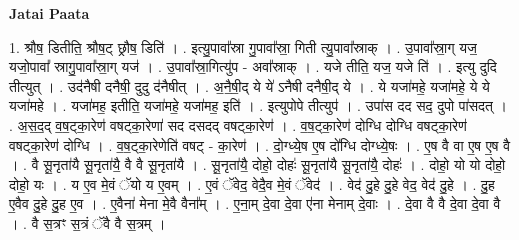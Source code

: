 \documentclass[17pt]{extarticle}
\begin{document}
\textbf{Jatai Paata} \newline

1. श्रौष॒ डितीति॒ श्रौष॒ट् छ्रौष॒ डिति॑ । . इत्यु॒पावा᳚स्रा गु॒पावा᳚स्रा॒ गिती त्यु॒पावा᳚स्राक् । . उ॒पावा᳚स्रा॒ग् यज॒ यजो॒पावा᳚ स्रागु॒पावा᳚स्रा॒ग् यज॑ । . उ॒पावा᳚स्रा॒गित्यु॑प - अवा᳚स्राक् । . यजे तीति॒ यज॒ यजे ति॑ । . इत्यु दुदि तीत्युत् । . उद॑नैषी दनैषी॒ दुदु द॑नैषीत् । . अ॒नै॒षी॒द् ये ये॑ ऽनैषी दनैषी॒द् ये । . ये यजा॑महे॒ यजा॑महे॒ ये ये यजा॑महे । . यजा॑मह॒ इतीति॒ यजा॑महे॒ यजा॑मह॒ इति॑ । . इत्युपोपे तीत्युप॑ । . उपा॑स दद सद॒ दुपो पा॑सदत् । . अ॒स॒द॒द् व॒ष॒ट्का॒रेण॑ वषट्का॒रेणा॑ सद दसदद् वषट्का॒रेण॑ । . व॒ष॒ट्का॒रेण॑ दोग्धि दोग्धि वषट्का॒रेण॑ वषट्का॒रेण॑ दोग्धि । . व॒ष॒ट्का॒रेणेति॑ वषट् - का॒रेण॑ । . दो॒ग्ध्ये॒ष ए॒ष दो᳚ग्धि दोग्ध्ये॒षः । . ए॒ष वै वा ए॒ष ए॒ष वै । . वै सू॒नृता॑यै सू॒नृता॑यै॒ वै वै सू॒नृता॑यै । . सू॒नृता॑यै॒ दोहो॒ दोहः॑ सू॒नृता॑यै सू॒नृता॑यै॒ दोहः॑ । . दोहो॒ यो यो दोहो॒ दोहो॒ यः । . य ए॒व मे॒वं ॅयो य ए॒वम् । . ए॒वं ॅवेद॒ वेदै॒व मे॒वं ॅवेद॑ । . वेद॑ दु॒हे दु॒हे वेद॒ वेद॑ दु॒हे । . दु॒ह ए॒वैव दु॒हे दु॒ह ए॒व । . ए॒वैना॑ मेना मे॒वै वैना᳚म् । . ए॒ना॒म् दे॒वा दे॒वा ए॑ना मेनाम् दे॒वाः । . दे॒वा वै वै दे॒वा दे॒वा वै । . वै स॒त्रꣳ स॒त्रं ॅवै वै स॒त्रम् । \newline
\end{document}
